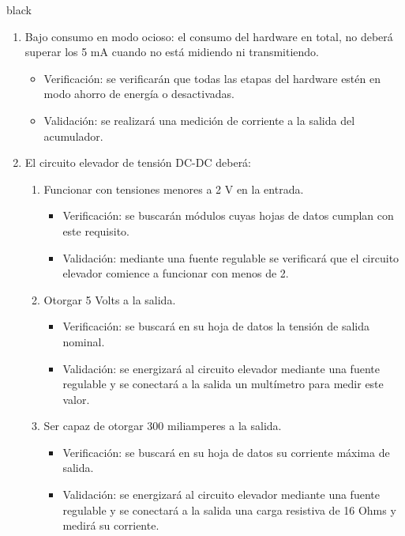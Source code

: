\documentclass[11pt]{charter}
\begin{document}
\begin{consigna}{black}
\begin{enumerate}
\begin{enumerate}[label*=\arabic*.]
			\item Bajo consumo en modo ocioso: el consumo del hardware en total, no deberá superar los 5 mA cuando no está midiendo ni transmitiendo.
				\begin{itemize}
					\item Verificación: se verificarán que todas las etapas del hardware estén en modo ahorro de energía o desactivadas.\\
					\item Validación: se realizará una medición de corriente a la salida del acumulador.\\
				\end{itemize}
				
			\item El circuito elevador de tensión DC-DC deberá:
			\begin{enumerate}[label*=\arabic*.]
				\item Funcionar con tensiones menores a 2 V en la entrada.
					\begin{itemize}
						\item Verificación: se buscarán módulos cuyas hojas de datos cumplan con este requisito.\\
						\item Validación: mediante una fuente regulable se verificará que el circuito elevador comience a funcionar con menos de 2.\\
					\end{itemize}
					
				\item Otorgar 5 Volts a la salida.
					\begin{itemize}
						\item Verificación: se buscará en su hoja de datos la tensión de salida nominal.\\
						\item Validación: se energizará al circuito elevador mediante una fuente regulable y se conectará a la salida un multímetro para medir este valor.\\
					\end{itemize}
					
				\item Ser capaz de otorgar 300 miliamperes a la salida.
					\begin{itemize}
						\item Verificación: se buscará en su hoja de datos su corriente máxima de salida.\\
						\item Validación: se energizará al circuito elevador mediante una fuente regulable y se conectará a la salida una carga resistiva de 16 Ohms y medirá su corriente.\\
					\end{itemize}
			\end{enumerate}
			

\end{enumerate}
\end{enumerate}
\end{consigna}
\end{document}
